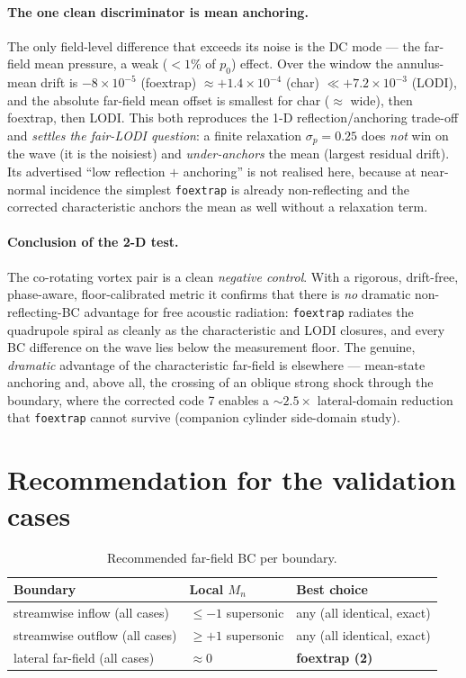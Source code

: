 \documentclass[11pt]{article}
\begin{document}
\paragraph{The one clean discriminator is mean anchoring.} The only field-level
difference that exceeds its noise is the DC mode --- the far-field mean pressure,
a weak ($<1\%$ of $p_0$) effect. Over the window the annulus-mean drift is
$-8\times10^{-5}$ (foextrap) $\approx +1.4\times10^{-4}$ (char)
$\ll +7.2\times10^{-3}$ (LODI), and the absolute far-field mean offset is
smallest for char ($\approx$ wide), then foextrap, then LODI. This both
reproduces the 1-D reflection/anchoring trade-off and \emph{settles the
fair-LODI question}: a finite relaxation $\sigma_p=0.25$ does \emph{not} win on
the wave (it is the noisiest) and \emph{under-anchors} the mean (largest residual
drift). Its advertised ``low reflection $+$ anchoring'' is not realised here,
because at near-normal incidence the simplest \texttt{foextrap} is already
non-reflecting and the corrected characteristic anchors the mean as well without
a relaxation term.

\paragraph{Conclusion of the 2-D test.} The co-rotating vortex pair is a clean
\emph{negative control}. With a rigorous, drift-free, phase-aware,
floor-calibrated metric it confirms that there is \emph{no} dramatic
non-reflecting-BC advantage for free acoustic radiation: \texttt{foextrap}
radiates the quadrupole spiral as cleanly as the characteristic and LODI
closures, and every BC difference on the wave lies below the measurement floor.
The genuine, \emph{dramatic} advantage of the characteristic far-field is
elsewhere --- mean-state anchoring and, above all, the crossing of an oblique
strong shock through the boundary, where the corrected code 7 enables a
$\sim2.5\times$ lateral-domain reduction that \texttt{foextrap} cannot survive
(companion cylinder side-domain study).

\section{Recommendation for the validation cases}
\begin{table}[h]\centering\small
\begin{tabular}{@{}lll@{}}
\toprule
Boundary & Local $M_n$ & Best choice \\
\midrule
streamwise inflow (all cases) & $\le-1$ supersonic & any (all identical, exact) \\
streamwise outflow (all cases) & $\ge+1$ supersonic & any (all identical, exact) \\
lateral far-field (all cases) & $\approx 0$ & \textbf{foextrap (2)} \\
\bottomrule
\end{tabular}
\caption{Recommended far-field BC per boundary.}
\end{table}
\end{document}
